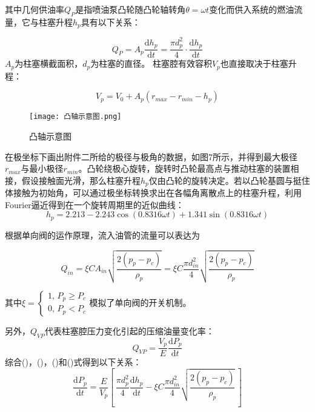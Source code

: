 \documentclass[withoutpreface,bwprint]{cumcmthesis} %
\begin{document}
			其中几何供油率$Q_P$是指喷油泵凸轮随凸轮轴转角$\theta = \omega t$变化而供入系统的燃油流量，它与柱塞升程$h_p$具有以下关系：
			
			\begin{equation}Q_P = A_p \frac{\mathrm{d}h_p}{\mathrm{d}t} = \frac{\pi d_p^2}{4} \cdot \frac{\mathrm{d}h_p}{\mathrm{d}t}\end{equation}
			$A_p$为柱塞横截面积，$d_p$为柱塞的直径。
			柱塞腔有效容积$V_p$也直接取决于柱塞升程：
			
			\begin{equation}V_p = V_0 + A_p (r_{max} - r_{min} - h_p)\end{equation}
			
			\begin{figure}[!htbp]
				\centering
				\texttt{[image: 凸轴示意图.png]}
				\caption{凸轴示意图}
			\end{figure}
		
			在极坐标下画出附件二所给的极径与极角的数据，如图7所示，并得到最大极径$r_{max}$与最小极径$r_{min}$。凸轮绕极心旋转，旋转时凸轮最高点与推动柱塞的装置相接，假设接触面光滑，那么柱塞升程$h_p$仅由凸轮的旋转决定。若以凸轮基圆与挺住体接触为初始角，可以通过极坐标转换求出在各幅角离散点上的柱塞升程，利用Fourier逼近得到在一个旋转周期里的近似曲线：
			\begin{equation}h_p = 2.213 - 2.243 \cos(0.8316 \omega t) + 1.341 \sin(0.8316 \omega t)\end{equation}
			
			根据单向阀的运作原理，流入油管的流量可以表达为
			
			\begin{equation}Q_{in} = \xi CA_{in} \sqrt{\frac{2(p_p - p_c)}{\rho_p}} = \xi C \frac{\pi d_{in}^2}{4} \sqrt{\frac{2(p_p - p_c)}{\rho_p}}\end{equation}
			
			其中$\xi = \left\{ \begin{aligned}  1, \, P_p \geq P_c \\ 0, \, P_p < P_c \end{aligned} \right.$模拟了单向阀的开关机制。
			
			另外，$Q_{VP}$代表柱塞腔压力变化引起的压缩油量变化率：
			$$
			Q_{VP} = \frac{V_p}{E} \frac{\mathrm{d}P_p}{\mathrm{d}t}
			$$
			综合()，()，()和()式得到以下关系：
			\begin{equation}
				\frac{\mathrm{d}P_p}{\mathrm{d}t} = \frac{E}{V_p} \left[ \, \frac{\pi d_p^2}{4}  \frac{\mathrm{d}h_p}{\mathrm{d}t} - \xi C \frac{\pi d_{in}^2}{4} \sqrt{\frac{2(p_p - p_c)}{\rho_p}} \, \right]
			\end{equation}
			
\end{document}
